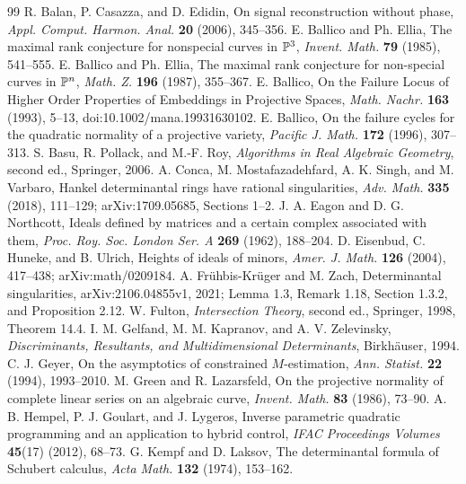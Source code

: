 \begin{thebibliography}{99}
 R. Balan, P. Casazza, and D. Edidin, On signal reconstruction without phase, \emph{Appl. Comput. Harmon. Anal.} \textbf{20} (2006), 345--356.
 E. Ballico and Ph. Ellia, The maximal rank conjecture for nonspecial curves in $\mathbb P^3$, \emph{Invent. Math.} \textbf{79} (1985), 541--555.
 E. Ballico and Ph. Ellia, The maximal rank conjecture for non-special curves in $\mathbb P^n$, \emph{Math. Z.} \textbf{196} (1987), 355--367.
 E. Ballico, On the Failure Locus of Higher Order Properties of Embeddings in Projective Spaces, \emph{Math. Nachr.} \textbf{163} (1993), 5--13, doi:10.1002/mana.19931630102.
 E. Ballico, On the failure cycles for the quadratic normality of a projective variety, \emph{Pacific J. Math.} \textbf{172} (1996), 307--313.
 S. Basu, R. Pollack, and M.-F. Roy, \emph{Algorithms in Real Algebraic Geometry}, second ed., Springer, 2006.
 A. Conca, M. Mostafazadehfard, A. K. Singh, and M. Varbaro, Hankel determinantal rings have rational singularities, \emph{Adv. Math.} \textbf{335} (2018), 111--129; arXiv:1709.05685, Sections 1--2.
 J. A. Eagon and D. G. Northcott, Ideals defined by matrices and a certain complex associated with them, \emph{Proc. Roy. Soc. London Ser. A} \textbf{269} (1962), 188--204.
 D. Eisenbud, C. Huneke, and B. Ulrich, Heights of ideals of minors, \emph{Amer. J. Math.} \textbf{126} (2004), 417--438; arXiv:math/0209184.
 A. Fr\"uhbis-Kr\"uger and M. Zach, Determinantal singularities, arXiv:2106.04855v1, 2021; Lemma 1.3, Remark 1.18, Section 1.3.2, and Proposition 2.12.
 W. Fulton, \emph{Intersection Theory}, second ed., Springer, 1998, Theorem 14.4.
 I. M. Gelfand, M. M. Kapranov, and A. V. Zelevinsky, \emph{Discriminants, Resultants, and Multidimensional Determinants}, Birkh\"auser, 1994.
 C. J. Geyer, On the asymptotics of constrained $M$-estimation, \emph{Ann. Statist.} \textbf{22} (1994), 1993--2010.
 M. Green and R. Lazarsfeld, On the projective normality of complete linear series on an algebraic curve, \emph{Invent. Math.} \textbf{83} (1986), 73--90.
 A. B. Hempel, P. J. Goulart, and J. Lygeros, Inverse parametric quadratic programming and an application to hybrid control, \emph{IFAC Proceedings Volumes} \textbf{45}(17) (2012), 68--73.
 G. Kempf and D. Laksov, The determinantal formula of Schubert calculus, \emph{Acta Math.} \textbf{132} (1974), 153--162.

\end{thebibliography}
